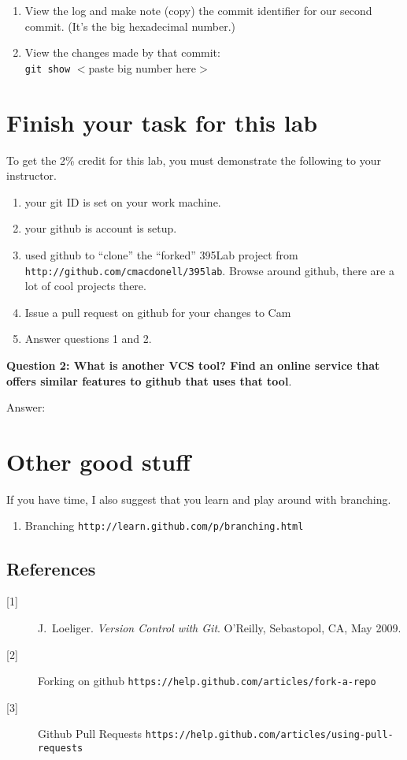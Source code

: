 \documentclass[letterpaper]{article}
\begin{document}
\begin{enumerate}
\item View the log and make note (copy) the commit identifier for our second commit.
  (It's the big hexadecimal number.)
\item View the changes made by that commit:\\
{\tt git show} $<$paste big number here$>$
\end{enumerate}

\section*{Finish your task for this lab}

To get the 2\% credit for this lab, you must demonstrate the following to your instructor.

\begin{enumerate}
\item your git ID is set on your work machine.
\item your github is account is setup.
\item used github to ``clone'' the ``forked'' 395Lab project from {\tt http://github.com/cmacdonell/395lab}.  Browse
around github, there are a lot of cool projects there.
\item Issue a pull request on github for your changes to Cam
\item Answer questions 1 and 2.
\end{enumerate}

{\bf Question 2: What is another VCS tool?  Find an online service that offers similar features to github that uses that tool}.

\noindent
Answer:
\vspace{2in}

\section*{Other good stuff}

\noindent
If you have time, I also suggest that you learn and play around with branching.

\begin{enumerate}
\item Branching {\tt http://learn.github.com/p/branching.html}
\end{enumerate}

\subsection*{References}

\begin{description} 
\item[{[1]}] J.~Loeliger. {\em Version Control with Git}. O'Reilly, Sebastopol, CA, May 2009.
\item[{[2]}] Forking on github {\tt https://help.github.com/articles/fork-a-repo}
\item[{[3]}] Github Pull Requests {\tt https://help.github.com/articles/using-pull-requests}
\end{description}
\end{document}
